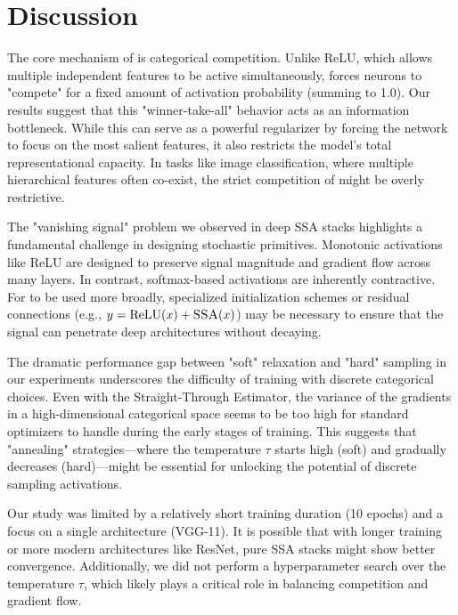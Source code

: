 \section{Discussion}

The core mechanism of \methodname is categorical competition. Unlike ReLU, which allows multiple independent features to be active simultaneously, \methodname forces neurons to "compete" for a fixed amount of activation probability (summing to 1.0). Our results suggest that this "winner-take-all" behavior acts as an information bottleneck. While this can serve as a powerful regularizer by forcing the network to focus on the most salient features, it also restricts the model's total representational capacity. In tasks like image classification, where multiple hierarchical features often co-exist, the strict competition of \methodname might be overly restrictive.

The "vanishing signal" problem we observed in deep \textsc{SSA} stacks highlights a fundamental challenge in designing stochastic primitives. Monotonic activations like ReLU are designed to preserve signal magnitude and gradient flow across many layers. In contrast, softmax-based activations are inherently contractive. For \methodname to be used more broadly, specialized initialization schemes or residual connections (e.g., $y = \text{ReLU}(x) + \textsc{SSA}(x)$) may be necessary to ensure that the signal can penetrate deep architectures without decaying.

The dramatic performance gap between "soft" relaxation and "hard" sampling in our experiments underscores the difficulty of training with discrete categorical choices. Even with the Straight-Through Estimator, the variance of the gradients in a high-dimensional categorical space seems to be too high for standard optimizers to handle during the early stages of training. This suggests that "annealing" strategies—where the temperature $\tau$ starts high (soft) and gradually decreases (hard)—might be essential for unlocking the potential of discrete sampling activations.

Our study was limited by a relatively short training duration (10 epochs) and a focus on a single architecture (VGG-11). It is possible that with longer training or more modern architectures like ResNet, pure \textsc{SSA} stacks might show better convergence. Additionally, we did not perform a hyperparameter search over the temperature $\tau$, which likely plays a critical role in balancing competition and gradient flow.
